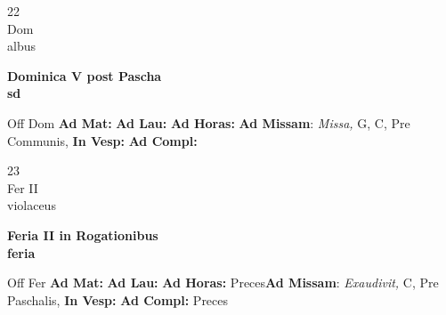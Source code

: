 \documentclass[10pt, openany]{book}
\begin{document}
        \begin{center}
            \begin{minipage}{3.5in}
                \vspace{2em}
                \begin{minipage}{0.5in}
                    {\Huge 22} \\
                    {\normalsize Dom} \\
                    {\normalsize albus}
                \end{minipage}
                \begin{minipage}{3.0in}
                    \textbf{ \large Dominica V post Pascha \\
                    \textnormal{\normalsize sd}} \\ 
                \end{minipage}
                \begin{justify}Off Dom
                    \textbf{Ad Mat: }
                    \textbf{Ad Lau: }
                    \textbf{Ad Horas: }\textbf{Ad Missam}: \textit{Missa,} G, C, Pre Communis,  
                    \textbf{In Vesp: }
                    \textbf{Ad Compl: }
                \end{justify}
            \end{minipage}
        \end{center}
    
        \begin{center}
            \begin{minipage}{3.5in}
                \vspace{2em}
                \begin{minipage}{0.5in}
                    {\Huge 23} \\
                    {\normalsize Fer II} \\
                    {\normalsize violaceus}
                \end{minipage}
                \begin{minipage}{3.0in}
                    \textbf{ \large Feria II in Rogationibus \\
                    \textnormal{\normalsize feria}} \\ 
                \end{minipage}
                \begin{justify}Off Fer
                    \textbf{Ad Mat: }
                    \textbf{Ad Lau: }
                    \textbf{Ad Horas: }Preces\textbf{Ad Missam}: \textit{Exaudivit,} C, Pre Paschalis,  
                    \textbf{In Vesp: }
                    \textbf{Ad Compl: }Preces
                \end{justify}
            \end{minipage}
        \end{center}
    
\end{document}
